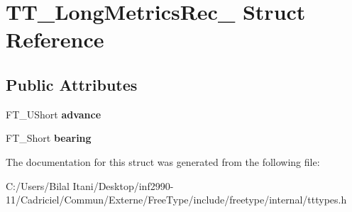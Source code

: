 \hypertarget{struct_t_t___long_metrics_rec__}{}\section{T\+T\+\_\+\+Long\+Metrics\+Rec\+\_\+ Struct Reference}
\label{struct_t_t___long_metrics_rec__}
\subsection*{Public Attributes}
\begin{DoxyCompactItemize}
\item 
F\+T\+\_\+\+U\+Short {\bfseries advance}\hypertarget{struct_t_t___long_metrics_rec___a47100e42b52486bc374f80ed2795361d}{}\label{struct_t_t___long_metrics_rec___a47100e42b52486bc374f80ed2795361d}

\item 
F\+T\+\_\+\+Short {\bfseries bearing}\hypertarget{struct_t_t___long_metrics_rec___a0d74e3eb8611b0a5e89e338af35be4da}{}\label{struct_t_t___long_metrics_rec___a0d74e3eb8611b0a5e89e338af35be4da}

\end{DoxyCompactItemize}


The documentation for this struct was generated from the following file\+:\begin{DoxyCompactItemize}
\item 
C\+:/\+Users/\+Bilal Itani/\+Desktop/inf2990-\/11/\+Cadriciel/\+Commun/\+Externe/\+Free\+Type/include/freetype/internal/tttypes.\+h\end{DoxyCompactItemize}
